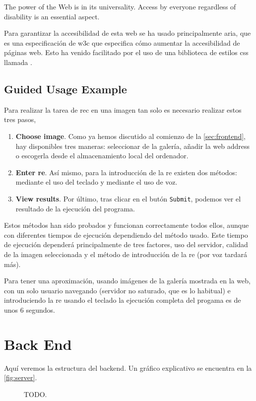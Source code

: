 \begin{quoteBox}
  The power of the Web is in its universality. Access by everyone regardless of
  disability is an essential aspect.
  \tcblower{}
\end{quoteBox}

Para garantizar la accesibilidad de esta web se ha usado principalmente
\gls{aria}, que es una especificación de \gls{w3c} que especifica cómo aumentar
la accesibilidad de páginas web. Esto ha venido facilitado por el uso de una
biblioteca de estilos \gls{css} llamada
.

\subsection{Guided Usage Example}

Para realizar la tarea de \gls{rec} en una imagen tan solo es necesario
realizar estos tres pasos,
\begin{enumerate}
  \item \textbf{Choose image}. Como ya hemos discutido al comienzo de la
  \vref{sec:frontend}, hay disponibles tres maneras: seleccionar de la galería,
  añadir la web address o escogerla desde el almacenamiento local del
  ordenador.
  \item \textbf{Enter \gls*{re}}. Así mismo, para la introducción de la
  \gls{re} existen dos métodos: mediante el uso del teclado y mediante el uso
  de voz.
  \item \textbf{View results}. Por último, tras clicar en el butón
  \texttt{Submit}, podemos ver el resultado de la ejecución del programa.
\end{enumerate}

Estos métodos han sido probados y funcionan correctamente todos ellos, aunque
con diferentes tiempos de ejecución dependiendo del método usado. Este tiempo
de ejecución dependerá principalmente de tres factores, uso del servidor,
calidad de la imagen seleccionada y el método de introducción de la \gls{re}
(por voz tardará más).

\begin{exampleBox}
  Para tener una aproximación, usando imágenes de la galería mostrada en la
  web, con un solo usuario navegando (servidor no saturado, que es lo habitual)
  e introduciendo la \gls{re} usando el teclado la ejecución completa del
  progama es de unos 6 segundos.
\end{exampleBox}


\section{Back End}\label{sec:backend}

Aquí veremos la estructura del backend. Un gráfico explicativo se encuentra en
la \vref{fig:server}.

\begin{figure}[ht]
  \centering
  
  \caption[TODO]{TODO.}
  \label{fig:server}
\end{figure}
